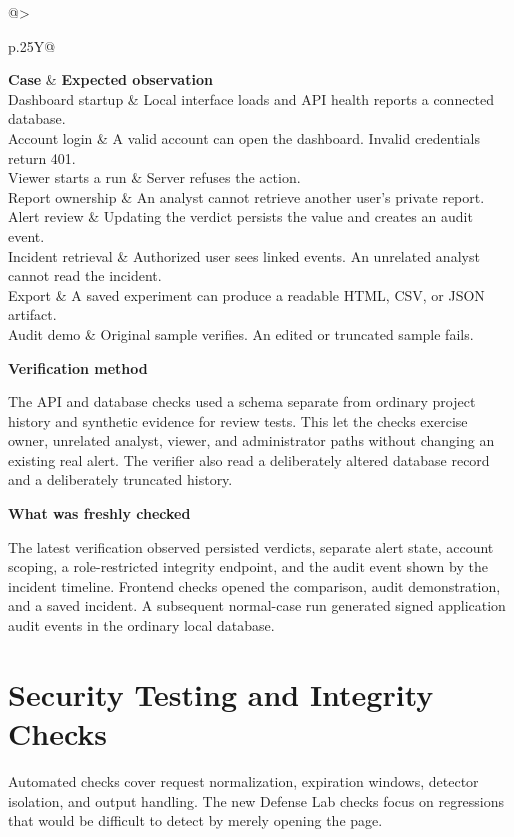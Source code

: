 \documentclass[11pt,letterpaper,oneside]{report}
\makeatletter
\newcommand{\topic}[1]{\smallskip\noindent\textbf{#1}\par\nobreak\vspace{-.39em}}
\newcommand{\sheet}[1]{\clearpage\section{#1}}
\newcommand{\tabletitle}[1]{\captionof{table}{#1}\smallskip}
\newcommand{\bodytable}[1]{\begin{tabularx}{\linewidth}{@{}>{\raggedright\arraybackslash}p{.25\linewidth}Y@{}}\toprule #1\bottomrule\end{tabularx}}
\makeatother
\begin{document}
\tabletitle{Functional acceptance cases}
\bodytable{\textbf{Case} & \textbf{Expected observation}\\\midrule
Dashboard startup & Local interface loads and API health reports a connected database.\\
Account login & A valid account can open the dashboard. Invalid credentials return 401.\\
Viewer starts a run & Server refuses the action.\\
Report ownership & An analyst cannot retrieve another user's private report.\\
Alert review & Updating the verdict persists the value and creates an audit event.\\
Incident retrieval & Authorized user sees linked events. An unrelated analyst cannot read the incident.\\
Export & A saved experiment can produce a readable HTML, CSV, or JSON artifact.\\
Audit demo & Original sample verifies. An edited or truncated sample fails.\\}

\topic{Verification method}
The API and database checks used a schema separate from ordinary project history and synthetic evidence for review tests. This let the checks exercise owner, unrelated analyst, viewer, and administrator paths without changing an existing real alert. The verifier also read a deliberately altered database record and a deliberately truncated history.

\topic{What was freshly checked}
The latest verification observed persisted verdicts, separate alert state, account scoping, a role-restricted integrity endpoint, and the audit event shown by the incident timeline. Frontend checks opened the comparison, audit demonstration, and a saved incident. A subsequent normal-case run generated signed application audit events in the ordinary local database.

\sheet{Security Testing and Integrity Checks}
Automated checks cover request normalization, expiration windows, detector isolation, and output handling. The new Defense Lab checks focus on regressions that would be difficult to detect by merely opening the page.
\end{document}
